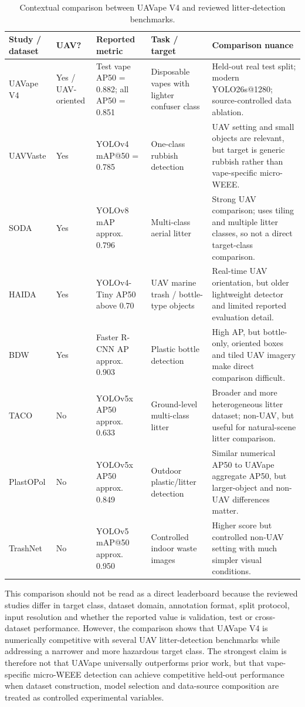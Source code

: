 \begin{table}[H]
\centering
\small
\begin{tabularx}{\textwidth}{p{} p{} p{} p{} X}
\toprule
\textbf{Study / dataset} & \textbf{UAV?} & \textbf{Reported metric} & \textbf{Task / target} & \textbf{Comparison nuance} \\
\midrule
UAVape V4 & Yes / UAV-oriented & Test vape AP50 = 0.882; all AP50 = 0.851 & Disposable vapes with lighter confuser class & Held-out real test split; modern YOLO26s@1280; source-controlled data ablation. \\
UAVVaste & Yes & YOLOv4 mAP@50 = 0.785 & One-class rubbish detection & UAV setting and small objects are relevant, but target is generic rubbish rather than vape-specific micro-WEEE. \\
SODA & Yes & YOLOv8 mAP approx. 0.796 & Multi-class aerial litter & Strong UAV comparison; uses tiling and multiple litter classes, so not a direct target-class comparison. \\
HAIDA & Yes & YOLOv4-Tiny AP50 above 0.70 & UAV marine trash / bottle-type objects & Real-time UAV orientation, but older lightweight detector and limited reported evaluation detail. \\
BDW & Yes & Faster R-CNN AP approx. 0.903 & Plastic bottle detection & High AP, but bottle-only, oriented boxes and tiled UAV imagery make direct comparison difficult. \\
TACO & No & YOLOv5x AP50 approx. 0.633 & Ground-level multi-class litter & Broader and more heterogeneous litter dataset; non-UAV, but useful for natural-scene litter comparison. \\
PlastOPol & No & YOLOv5x AP50 approx. 0.849 & Outdoor plastic/litter detection & Similar numerical AP50 to UAVape aggregate AP50, but larger-object and non-UAV differences matter. \\
TrashNet & No & YOLOv5 mAP@50 approx. 0.950 & Controlled indoor waste images & Higher score but controlled non-UAV setting with much simpler visual conditions. \\
\bottomrule
\end{tabularx}
\caption{Contextual comparison between UAVape V4 and reviewed litter-detection benchmarks.}
\label{tab:discussion_literature_comparison}
\end{table}

This comparison should not be read as a direct leaderboard because the reviewed studies differ in target class, dataset domain, annotation format, split protocol, input resolution and whether the reported value is validation, test or cross-dataset performance. However, the comparison shows that UAVape V4 is numerically competitive with several UAV litter-detection benchmarks while addressing a narrower and more hazardous target class. The strongest claim is therefore not that UAVape universally outperforms prior work, but that vape-specific micro-WEEE detection can achieve competitive held-out performance when dataset construction, model selection and data-source composition are treated as controlled experimental variables.

